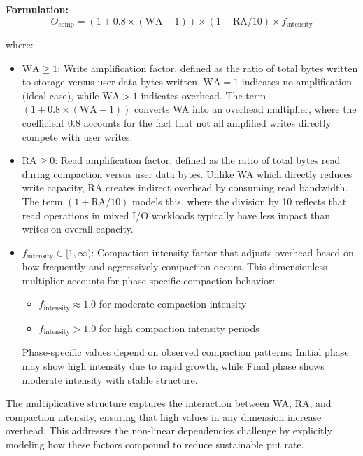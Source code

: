 \documentclass[11pt]{article}
\begin{document}
\textbf{Formulation:}
\begin{equation}
O_{\text{comp}} = (1 + 0.8 \times (\text{WA} - 1)) \times (1 + \text{RA}/10) \times f_{\text{intensity}}
\label{eq:compaction_overhead}
\end{equation}

where:
\begin{itemize}
    \item $\text{WA} \geq 1$: Write amplification factor, defined as the ratio of total bytes written to storage versus user data bytes written. $\text{WA} = 1$ indicates no amplification (ideal case), while $\text{WA} > 1$ indicates overhead. The term $(1 + 0.8 \times (\text{WA} - 1))$ converts WA into an overhead multiplier, where the coefficient 0.8 accounts for the fact that not all amplified writes directly compete with user writes.
    
    \item $\text{RA} \geq 0$: Read amplification factor, defined as the ratio of total bytes read during compaction versus user data bytes. Unlike WA which directly reduces write capacity, RA creates indirect overhead by consuming read bandwidth. The term $(1 + \text{RA}/10)$ models this, where the division by 10 reflects that read operations in mixed I/O workloads typically have less impact than writes on overall capacity.
    
    \item $f_{\text{intensity}} \in [1, \infty)$: Compaction intensity factor that adjusts overhead based on how frequently and aggressively compaction occurs. This dimensionless multiplier accounts for phase-specific compaction behavior:
    \begin{itemize}
        \item $f_{\text{intensity}} \approx 1.0$ for moderate compaction intensity
        \item $f_{\text{intensity}} > 1.0$ for high compaction intensity periods
    \end{itemize}
    Phase-specific values depend on observed compaction patterns: Initial phase may show high intensity due to rapid growth, while Final phase shows moderate intensity with stable structure.
\end{itemize}

The multiplicative structure captures the interaction between WA, RA, and compaction intensity, ensuring that high values in any dimension increase overhead. This addresses the non-linear dependencies challenge by explicitly modeling how these factors compound to reduce sustainable put rate.
\end{document}
